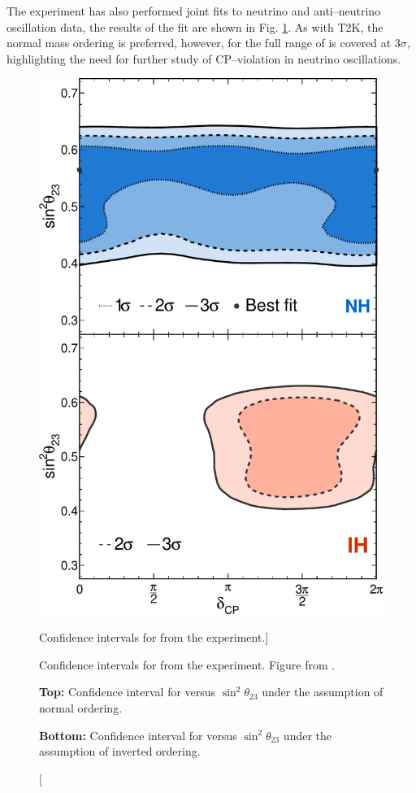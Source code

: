 The \nova{} experiment has also performed joint fits to neutrino and
anti--neutrino oscillation data, the results of the fit are shown in Fig.
\ref{fig:nova_cp}. As with T2K, the normal mass ordering is preferred, however,
for \nova{} the full range of \dcp{} is covered at $3\sigma$, highlighting the 
need for further study of CP--violation in neutrino 
oscillations\cite{PhysRevLett.123.151803}.

\begin{figure}

	\centering

	\includegraphics[height=0.75\textheight]{figures/nova_dcp.pdf}

	\caption
	[Confidence intervals for \dcp{} from the \nova{} experiment.]
	{Confidence intervals for \dcp{} from the \nova{} experiment. Figure from 
	\cite{PhysRevLett.123.151803}.

	\medskip
	\textbf{Top:} Confidence interval for \dcp{} versus $\sin^2\theta_{23}$ under the
	assumption of normal ordering.

	\medskip
	\textbf{Bottom:} Confidence interval for \dcp{} versus $\sin^2\theta_{23}$ under the
	assumption of inverted ordering.
	}
	\label{fig:nova_cp}
\end{figure}

